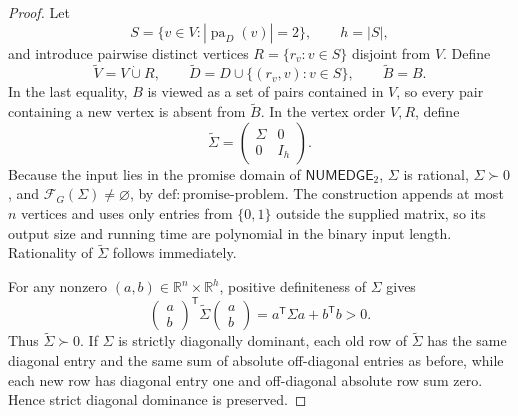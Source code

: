 \documentclass{article}
\begin{document}
\begin{proof}
Let
\[
S=\{v\in V:|\operatorname{pa}_D(v)|=2\},
\qquad h=|S|,
\]
and introduce pairwise distinct vertices \(R=\{r_v:v\in S\}\) disjoint from \(V\). Define
\[
\widetilde V=V\mathbin{\dot\cup}R,
\qquad
\widetilde D=D\cup\{(r_v,v):v\in S\},
\qquad
\widetilde B=B.
\]
In the last equality, \(B\) is viewed as a set of pairs contained in \(V\), so every pair containing a new vertex is absent from \(\widetilde B\). In the vertex order \(V,R\), define
\[
\widetilde\Sigma=
\begin{pmatrix}
\Sigma&0\\
0&I_h
\end{pmatrix}.
\]
Because the input lies in the promise domain of \(\mathsf{NUMEDGE}_2\), \(\Sigma\) is rational, \(\Sigma\succ0\), and \(\mathcal F_G(\Sigma)\ne\varnothing\), by \(\mathrm{def:promise\mbox{-}problem}\). The construction appends at most \(n\) vertices and uses only entries from \(\{0,1\}\) outside the supplied matrix, so its output size and running time are polynomial in the binary input length. Rationality of \(\widetilde\Sigma\) follows immediately.

For any nonzero \((a,b)\in\mathbb R^n\times\mathbb R^h\), positive definiteness of \(\Sigma\) gives
\[
\begin{pmatrix}a\\b\end{pmatrix}^{\!\mathsf T}
\widetilde\Sigma
\begin{pmatrix}a\\b\end{pmatrix}
=a^{\mathsf T}\Sigma a+b^{\mathsf T}b>0.
\]
Thus \(\widetilde\Sigma\succ0\). If \(\Sigma\) is strictly diagonally dominant, each old row of \(\widetilde\Sigma\) has the same diagonal entry and the same sum of absolute off-diagonal entries as before, while each new row has diagonal entry one and off-diagonal absolute row sum zero. Hence strict diagonal dominance is preserved.


\end{proof}
\end{document}
